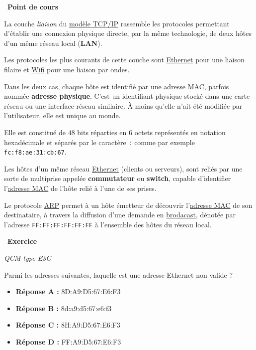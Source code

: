 \documentclass[
  11pt,
]{article}
\newcommand{\passthrough}[1]{#1}
\providecommand{\tightlist}{%
  \setlength{\itemsep}{0pt}\setlength{\parskip}{0pt}}
\newcounter{exo}
\newenvironment{exercice}[1]
{\par \medskip   \addtocounter{exo}{1} \noindent  
\begin{bclogo}[arrondi =0.1,   noborder = true, logo=\bccrayon, marge=4]{~\textbf{Exercice} \textbf{\theexo} {\itshape #1} }  \par}
{
\end{bclogo}
 \par \bigskip }
\newcounter{cours}
\newenvironment{cours}[1]
{\par \medskip   \addtocounter{cours}{1} \noindent  
\begin{bclogo}[arrondi =0.1,  ombre = true, barre=none, logo=\bcbook, marge=4]{~\textbf{Point de cours} \textbf{\thecours} {\itshape #1} }  \par}
{
\end{bclogo}
 \par \bigskip }
\newcounter{logi}
\begin{document}
\begin{cours}{}

La couche \emph{liaison} du
\href{https://fr.wikipedia.org/wiki/Suite_des_protocoles_Internet}{modèle
TCP/IP} rassemble les protocoles permettant d'établir une connexion
physique directe, par la même technologie, de deux hôtes d'un même
réseau local (\textbf{LAN}).

Les protocoles les plus courants de cette couche sont
\href{https://fr.wikipedia.org/wiki/Ethernet}{Ethernet} pour une liaison
filaire et \href{https://fr.wikipedia.org/wiki/Wi-Fi}{Wifi} pour une
liaison par ondes.

Dans les deux cas, chaque hôte est identifié par une
\href{https://fr.wikipedia.org/wiki/Adresse_MAC}{adresse MAC}, parfois
nommée \textbf{adresse physique}. C'est un identifiant physique stocké
dans une carte réseau ou une interface réseau similaire. À moins qu'elle
n'ait été modifiée par l'utilisateur, elle est unique au monde.

Elle est constitué de \(48\) bits réparties en \(6\) octets représentés
en notation hexadécimale et séparés par le caractère
\passthrough{\lstinline!:!} comme par exemple
\passthrough{\lstinline!fc:f8:ae:31:cb:67!}.

Les hôtes d'un même réseau
\href{https://fr.wikipedia.org/wiki/Ethernet}{Ethernet} (clients ou
serveurs), sont reliés par une sorte de multiprise appelée
\textbf{commutateur} ou \textbf{switch}, capable d'identifier
l'\href{https://fr.wikipedia.org/wiki/Adresse_MAC}{adresse MAC} de
l'hôte relié à l'une de ses prises.

Le protocole
\href{https://fr.wikipedia.org/wiki/Address_Resolution_Protocol}{ARP}
permet à un hôte émetteur de découvrir
l'\href{https://fr.wikipedia.org/wiki/Adresse_MAC}{adresse MAC} de son
destinataire, à travers la diffusion d'une demande en
\href{https://fr.wikipedia.org/wiki/Broadcast_(informatique)}{brodacast},
dénotée par l'adresse \passthrough{\lstinline!FF:FF:FF:FF:FF:FF!} à
l'ensemble des hôtes du réseau local.

\end{cours}

\begin{exercice}{}

\emph{QCM type E3C}

Parmi les adresses suivantes, laquelle est une adresse Ethernet non
valide ?

\begin{itemize}
\tightlist
\item
  \textbf{Réponse A :} 8D:A9:D5:67:E6:F3
\item
  \textbf{Réponse B :} 8d:a9:d5:67:e6:f3
\item
  \textbf{Réponse C :} 8H:A9:D5:67:E6:F3
\item
  \textbf{Réponse D :} FF:A9:D5:67:E6:F3
\end{itemize}

\end{exercice}
\end{document}

